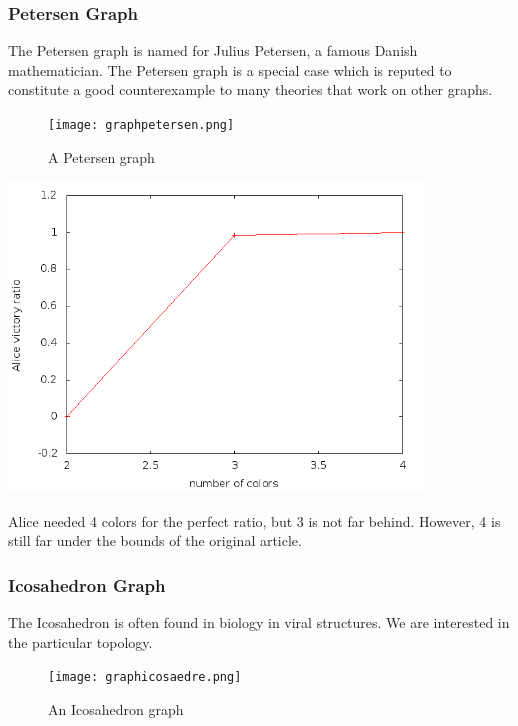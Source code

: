\subsubsection{Petersen Graph}

The Petersen graph is named for Julius Petersen, a famous Danish mathematician. The Petersen graph is a special case which is reputed to constitute a good counterexample to many theories that work on other graphs.

\begin{figure}[h]
\begin{center}  
	\texttt{[image: graphpetersen.png]}
\end{center}
    \caption{A Petersen graph}
    \label{petersengraph}
\end{figure}

\includegraphics[width=11cm]{resultats/petersen.png}

Alice needed 4 colors for the perfect ratio, but 3 is not far behind. However, 4 is still far under the bounds of the original article.

\subsubsection{Icosahedron Graph}

The Icosahedron is often found in biology in viral structures. We are interested in the particular topology.

\begin{figure}[h]
\begin{center}  
	\texttt{[image: graphicosaedre.png]}
\end{center}
    \caption{An Icosahedron graph}
    \label{icograph}
\end{figure}

